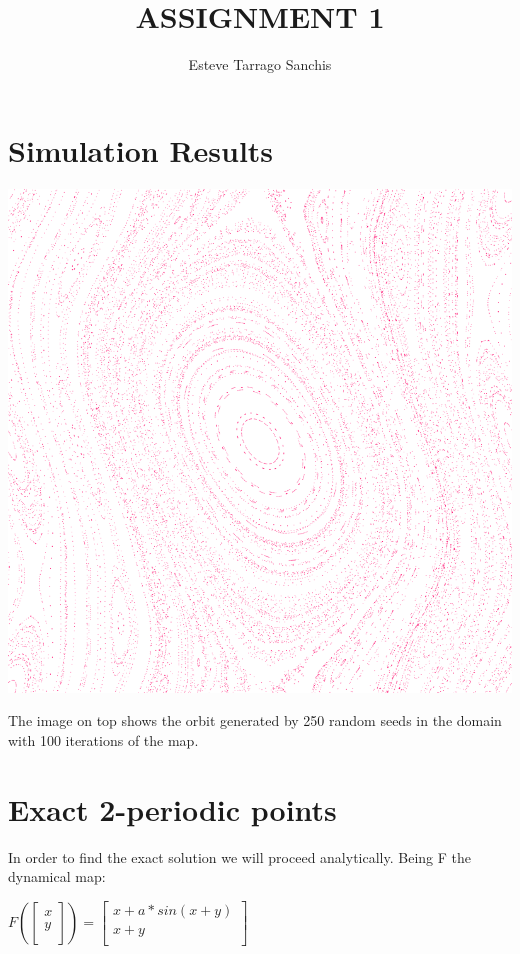 \documentclass[]{scrartcl}
\title{ASSIGNMENT 1}
\author{Esteve Tarrago Sanchis}
\begin{document}
\maketitle

\abstract



\section{Simulation Results}
\includegraphics[width=\linewidth]{orbit.png}

The image on top shows the orbit generated by 250 random seeds in the domain with 100 iterations of the map.
\section{Exact 2-periodic points}
In order to find the exact solution we will proceed analytically.
Being F the dynamical map:

$
F(
\begin{bmatrix}
x \\
y \\
\end{bmatrix}) =  \begin{bmatrix}
x + a * sin(x + y) \\
x + y \\
\end{bmatrix}
$
\end{document}
